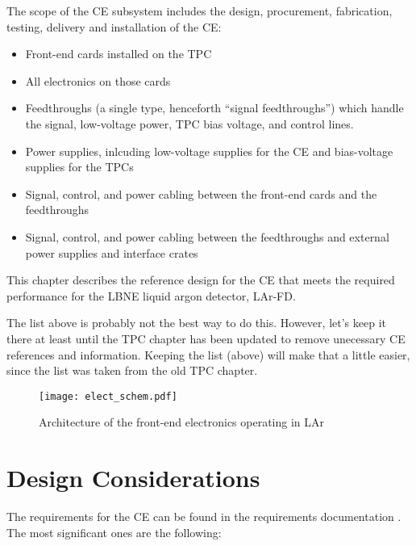 The scope of the CE subsystem includes the design, procurement, fabrication, testing,
delivery and installation of the CE:
\begin{itemize}
\item Front-end cards installed on the TPC
\item All electronics on those cards
\item Feedthroughs (a single type, henceforth ``signal feedthroughs'') which handle the signal,
low-voltage power, TPC bias voltage, and control lines.
\item Power supplies, inlcuding low-voltage supplies for the CE and bias-voltage supplies for the TPCs
\item Signal, control, and power cabling between the front-end cards and the feedthroughs
\item Signal, control, and power cabling between the feedthroughs and external power supplies and interface crates
\end{itemize}
This chapter describes the reference design for the CE that meets the required performance for the LBNE liquid argon detector,
LAr-FD.
\begin{editornote}
  The list above is probably not the best way to do this.  However, let's keep it there at least until the TPC chapter has been
  updated to remove unecessary CE references and information.  Keeping the list (above) will make that a little easier, since the
  list was taken from the old TPC chapter.
\end{editornote}
 
\begin{figure}[htbp]
\centering
\texttt{[image: elect\_schem.pdf]}
\caption{Architecture of the front-end electronics operating in LAr}
\label{fig:ce-elec-schematic}
\end{figure}

\section{Design Considerations} 
\label{sec:ce-reqs-n-specs}

The requirements for the CE can be found in the requirements documentation \cite{lar-fd-req}.
The most significant ones are the following:

